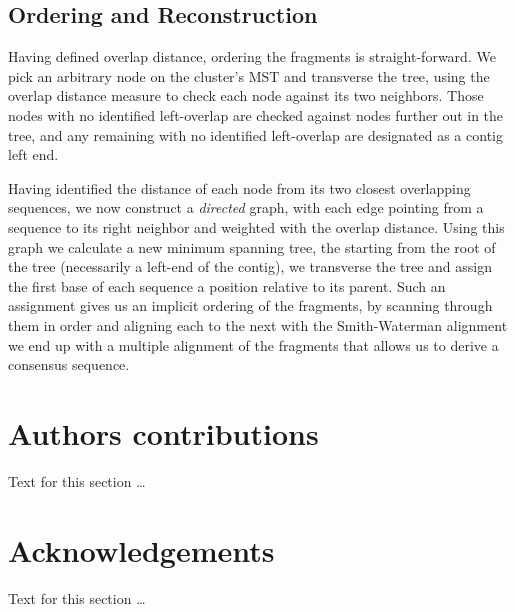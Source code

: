 \documentclass[10pt]{bmc_article}
\newenvironment{bmcformat}{\begin{raggedright}\baselineskip20pt\sloppy\setboolean{publ}{false}}{\end{raggedright}\baselineskip20pt\sloppy}
\begin{document}
\begin{bmcformat}
\subsection*{Ordering and Reconstruction}

Having defined overlap distance, ordering the fragments is
straight-forward.  We pick an arbitrary node on the cluster's MST and
transverse the tree, using the overlap distance measure to check each
node against its two neighbors.  Those nodes with no identified
left-overlap are checked against nodes further out in the tree, and
any remaining with no identified left-overlap are designated as a contig
left end.

Having identified the distance of each node from its two closest
overlapping sequences, we now construct a {\it directed} graph, with
each edge pointing from a sequence to its right neighbor and weighted
with the overlap distance.  Using this graph we calculate a new
minimum spanning tree, the starting from the root of the tree
(necessarily a left-end of the contig), we transverse the tree and
assign the first base of each sequence a position relative to its
parent.  Such an assignment gives us an implicit ordering of the
fragments, by scanning through them in order and aligning each to
the next with the Smith-Waterman alignment we end up with a multiple
alignment of the fragments that allows us to derive a consensus
sequence.






    
\section*{Authors contributions}
    Text for this section \ldots

    

\section*{Acknowledgements}
  Text for this section \ldots


 



\end{bmcformat}
\end{document}
